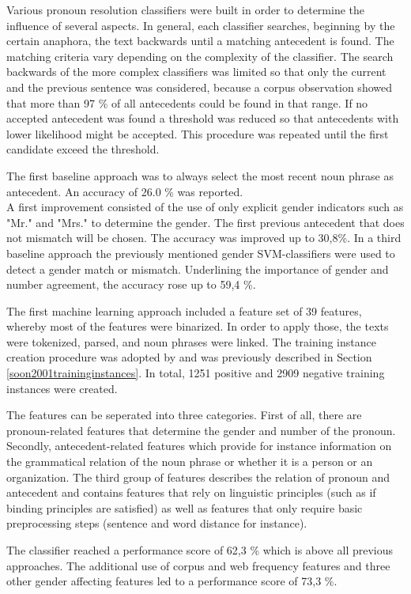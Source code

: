Various pronoun resolution classifiers were built in order to determine the influence of several aspects. In general, each classifier searches, beginning by the certain anaphora, the text backwards until a matching antecedent is found. The matching criteria vary depending on the complexity of the classifier. The search backwards of the more complex classifiers was limited so that only the current and the previous sentence was considered, because a corpus observation showed that more than 97 \% of all antecedents could be found in that range. If no accepted antecedent was found a threshold was reduced so that antecedents with lower likelihood might be accepted. This procedure was repeated until the first candidate exceed the threshold. 

The first baseline approach was to always select the most recent noun phrase as antecedent. An accuracy of 26.0 \% was reported. \\
A first improvement consisted of the use of only explicit gender indicators such as "Mr." and "Mrs." to determine the gender. The first previous antecedent that does not mismatch will be chosen. The accuracy was improved up to 30,8\%. 
In a third baseline approach the previously mentioned gender SVM-classifiers were used to detect a gender match or mismatch. Underlining the importance of gender and number agreement, the accuracy rose up to 59,4 \%.

The first machine learning approach included a feature set of 39 features, whereby most of the features were binarized. In order to apply those, the texts were tokenized, parsed, and noun phrases were linked. The training instance creation procedure was adopted by \cite{soon2001machine} and was previously described in Section \ref{soon2001traininginstances}. In total, 1251 positive and 2909 negative training instances were created. 

The features can be seperated into three categories. First of all, there are pronoun-related features that determine the gender and number of the pronoun. Secondly, antecedent-related features which provide for instance information on the grammatical relation of the noun phrase or whether it is a person or an organization. The third group of features describes the relation of pronoun and antecedent and contains features that rely on linguistic principles (such as if binding principles are satisfied) as well as features that only require basic preprocessing steps (sentence and word distance for instance).

The classifier reached a performance score of 62,3 \% which is above all previous approaches. The additional use of corpus and web frequency features and three other gender affecting features led to a performance score of 73,3 \%. 

